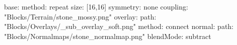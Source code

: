 base:
  method: repeat
  size: [16,16]
  symmetry: none
  coupling: "Blocks/Terrain/stone_mossy.png"
overlay:
  path: "Blocks/Overlays/_sub_overlay_soft.png"
  method: connect
normal:
  path: "Blocks/Normalmaps/stone_normalmap.png"
blendMode: subtract